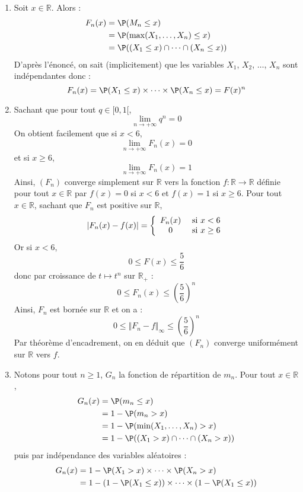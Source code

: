 \documentclass[a4paper,twoside,french,11pt]{VcCours}
\begin{document}
\begin{enumerate}
\item Soit $x \in \mathbb{R}$. Alors :
\begin{align*}
 F_n(x) & = \P(M_n \leq x) \\
 & = \P(\max(X_1, \ldots, X_n) \leq x) \\
 & = \P((X_1 \leq x) \cap \cdots \cap  (X_n \leq x)) 
\end{align*}
D'après l'énoncé, on sait (implicitement) que les variables $X_1$, $X_2$, $\ldots$, $X_n$ sont indépendantes donc :
$$ F_n(x) = \P(X_1 \leq x) \times \cdots \times \P(X_n \leq x) = F(x)^n$$
\item Sachant que pour tout $q \in [0,1[$,
$$ \lim_{n \rightarrow + \infty} q^n = 0$$
On obtient facilement que si $x<6$,
$$ \lim_{n \rightarrow + \infty} F_n(x) = 0$$ 
et si $x \geq 6$,
$$ \lim_{n \rightarrow + \infty} F_n(x)=1$$
Ainsi, $(F_n)$ converge simplement sur $\mathbb{R}$ vers la fonction $f : \mathbb{R} \rightarrow \mathbb{R}$ définie pour tout $x \in \mathbb{R}$ par $f(x) = 0$ si $x<6$ et $f(x)=1$ si $x \geq 6$.
Pour tout $x \in \mathbb{R}$, sachant que $F_n$ est positive sur $\mathbb{R}$,
$$ \vert F_n(x) -f(x) \vert = \left\lbrace \begin{array}{cl}
F_n(x) & \hbox{ si } x < 6 \\
0 & \hbox{ si } x \geq 6  \\
\end{array}\right.$$
Or si $x<6$, 
$$0 \leq F(x) \leq \dfrac{5}{6}$$
donc par croissance de $t \mapsto t^n$ sur $\mathbb{R}_+$ :
$$ 0 \leq F_n(x) \leq \left( \dfrac{5}{6} \right)^n$$
Ainsi, $F_n$ est bornée sur $\mathbb{R}$ et on a :
$$0 \leq \Vert F_n -f \Vert_{\infty} \leq \left( \dfrac{5}{6} \right)^n$$
Par théorème d'encadrement, on en déduit que $(F_n)$ converge uniformément sur $\mathbb{R}$ vers $f$.
\item Notons pour tout $n \geq 1$, $G_n$ la fonction de répartition de $m_n$. Pour tout $x \in \mathbb{R}$,
\begin{align*}
 G_n(x) & = \P(m_n \leq x) \\
 & = 1 - \P(m_n >x) \\
 & =1-\P(\min(X_1, \ldots, X_n) > x) \\
 & =1-\P((X_1 > x) \cap \cdots \cap  (X_n > x)) 
\end{align*}
puis par indépendance des variables aléatoires :
\begin{align*}
 G_n(x) & =1-\P(X_1 > x) \times  \cdots \times \P(X_n > x) \\
 & = 1- (1-\P(X_1 \leq x)) \times \cdots \times (1-\P(X_1 \leq x)) \\

\end{align*}
\end{enumerate}
\end{document}
